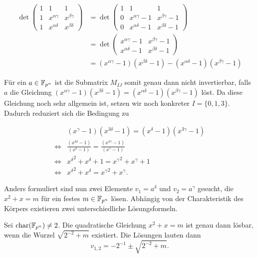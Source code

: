 \begin{align*}
    \det \begin{pmatrix}
        1 & 1 & 1 \\
        1 & x^{\alpha\gamma} & x^{\beta\gamma} \\
        1 & x^{\alpha\delta} & x^{\beta\delta}
    \end{pmatrix} 
    &= \det \begin{pmatrix}
        1 & 1 & 1 \\
        0 & x^{\alpha\gamma} -1 & x^{\beta\gamma} -1 \\
        0 & x^{\alpha\delta} -1 & x^{\beta\delta} -1
    \end{pmatrix} \\
    &= \det \begin{pmatrix}
        x^{\alpha\gamma} -1 & x^{\beta\gamma} -1 \\
        x^{\alpha\delta} -1 & x^{\beta\delta} -1
    \end{pmatrix} \\
    &= (x^{\alpha\gamma} -1)(x^{\beta\delta} -1) - (x^{\alpha\delta} -1)(x^{\beta\gamma} -1)
\end{align*}

Für ein $a \in \field{p}[n]$ ist die Submatrix $M_{IJ}$ somit genau dann nicht invertierbar, falls $a$ die Gleichung $(x^{\alpha\gamma} -1)(x^{\beta\delta} -1) = (x^{\alpha\delta} -1)(x^{\beta\gamma} -1)$ löst. Da diese Gleichung noch sehr allgemein ist, setzen wir noch konkreter $I = \{0,1,3\}$. Dadurch reduziert sich die Bedingung zu

\begin{align}
        & (x^{\gamma} -1)(x^{3\delta} -1) = (x^{\delta} -1)(x^{3\gamma} -1) \nonumber \\
    \iff & \frac{(x^{3\delta} -1)}{(x^{\delta} -1)} = \frac{(x^{3\gamma} -1)}{(x^{\gamma} -1)} \nonumber \\
    \iff & {x^\delta}^2 + x^{\delta} + 1 = {x^{\gamma}}^2 + x^{\gamma} + 1 \nonumber \\
    \iff & {x^\delta}^2 + x^{\delta} = {x^{\gamma}}^2 + x^{\gamma}. \label{equation:013}
\end{align}

Anders formuliert sind nun zwei Elemente $v_1 = a^\delta$ und $v_2 = a^\gamma$ gesucht, die $x^2 + x = m$ für ein festes $m \in \field{p}[n]$ lösen. Abhängig von der Charakteristik des Körpers existieren zwei unterschiedliche Lösungsformeln.

\begin{lemma}
    Sei $\charac(\field{p}[n]) \neq 2$. Die quadratische Gleichung $x^2 + x = m$ ist genau dann lösbar, wenn die Wurzel $\sqrt{2^{-2} + m}$ existiert. Die Lösungen lauten dann
    \begin{equation*}
        v_{1,2} = -2^{-1} \pm \sqrt{2^{-2} + m}.
    \end{equation*}
\end{lemma}


